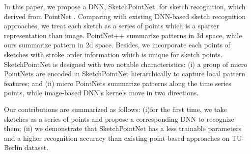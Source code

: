 In this paper, we propose a DNN, SketchPointNet, for sketch recognition, which derived from PointNet \cite{qi2017pointnet}. Comparing with existing DNN-based sketch recognition approaches, we treat each sketch as a series of points which is a sparser representation than image. PointNet++ \cite{qi2017pointnetplusplus} summarize patterns in 3d space, while ours summarize pattern in 2d space. Besides, we incorporate each points of sketches with stroke order information which is unique for sketch points. SketchPointNet is designed with two notable characteristics: (i) a group of micro PointNets are encoded in SketchPointNet hierarchically to capture local pattern features; and (ii) micro PointNets summarize patterns along the time series points, while image-based DNN's kernels move in two directions.

Our contributions are summarized as follows: (i)for the first time, we take sketches as a series of points and propose a corresponding DNN to recognize them; (ii) we demonstrate that SketchPointNet has a less trainable parameters and a higher recognition accuracy than existing point-based approaches on TU-Berlin dataset.
